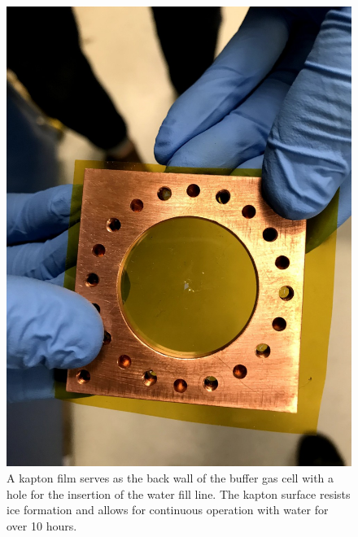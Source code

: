 \documentclass[a4paper]{article}
\begin{document}
\begin{figure}[H]
\centering
\includegraphics[width=.7\textwidth]{kapton.jpg}
\caption{A kapton film serves as the back wall of the buffer gas cell with a hole for the insertion of the water fill line. The kapton surface resists ice formation and allows for continuous operation with water for over 10 hours.}
\label{f: kapton}
\end{figure}
\end{document}
